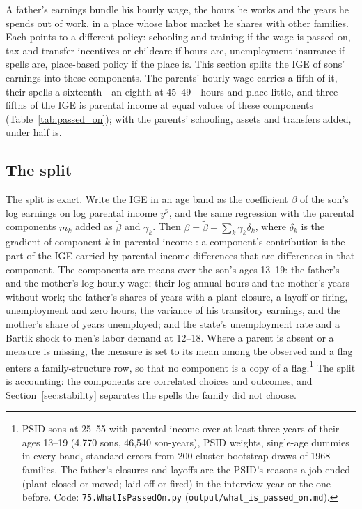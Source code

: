 
A father's earnings bundle his hourly wage, the hours he works and the years he spends out of work, in a place whose
labor market he shares with other families. Each points to a different policy: schooling and training if the wage is
passed on, tax and transfer incentives or childcare if hours are, unemployment insurance if spells are, place-based
policy if the place is. This section splits the IGE of sons' earnings into these components. The parents' hourly wage
carries a fifth of it, their spells a sixteenth---an eighth at 45--49---hours and place little, and three fifths of the
IGE is parental income at equal values of these components (Table~\ref{tab:passed_on}); with the parents' schooling,
assets and transfers added, under half is.

\subsection{The split}

The split is exact. Write the IGE in an age band as the coefficient $\beta$ of the son's log earnings on log parental
income $\bar y^p$, and the same regression with the parental components $m_k$ added as $\tilde\beta$ and $\gamma_k$.
Then $\beta = \tilde\beta + \sum_k \gamma_k \delta_k$, where $\delta_k$ is the gradient of component $k$ in parental
income \citep{gelbach2016covariates}: a component's contribution is the part of the IGE carried by parental-income
differences that are differences in that component. The components are means over the son's ages 13--19: the father's
and the mother's log hourly wage; their log annual hours and the mother's years without work; the father's shares of
years with a plant closure, a layoff or firing, unemployment and zero hours, the variance of his transitory earnings,
and the mother's share of years unemployed; and the state's unemployment rate and a Bartik shock to men's labor demand
at 12--18. Where a parent is absent or a measure is missing, the measure is set to its mean among the observed and a flag
enters a family-structure row, so that no component is a copy of a flag.\footnote{PSID sons at 25--55 with parental
income over at least three years of their ages 13--19 (4,770 sons, 46,540 son-years), PSID weights, single-age dummies
in every band, standard errors from 200 cluster-bootstrap draws of 1968 families. The father's closures and layoffs are
the PSID's reasons a job ended (plant closed or moved; laid off or fired) in the interview year or the one before. Code:
\texttt{75.WhatIsPassedOn.py} (\texttt{output/what\_is\_passed\_on.md}).} The split is accounting: the components are
correlated choices and outcomes, and Section~\ref{sec:stability} separates the spells the family did not choose.


